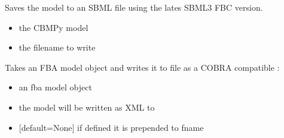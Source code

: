\documentclass[letterpaper,10pt,english]{sphinxmanual}
\begin{document}
\begin{fulllineitems}
\label{\detokenize{modules_doc:cbmpy.CBWrite.saveModel}}
\pysigstartsignatures
{}
\pysigstopsignatures
\sphinxAtStartPar
Saves the model to an SBML file using the lates SBML3 FBC version.
\begin{itemize}
\item {} 
\sphinxAtStartPar
{} the CBMPy model

\item {} 
\sphinxAtStartPar
{} the filename to write

\end{itemize}

\end{fulllineitems}


\begin{fulllineitems}
\label{\detokenize{modules_doc:cbmpy.CBWrite.writeCOBRASBML}}
\pysigstartsignatures
{}
\pysigstopsignatures
\sphinxAtStartPar
Takes an FBA model object and writes it to file as a COBRA compatible :
\begin{itemize}
\item {} 
\sphinxAtStartPar
{} an fba model object

\item {} 
\sphinxAtStartPar
{} the model will be written as XML to 

\item {} 
\sphinxAtStartPar
{} {[}default=None{]} if defined it is prepended to fname

\end{itemize}

\end{fulllineitems}

\end{document}
